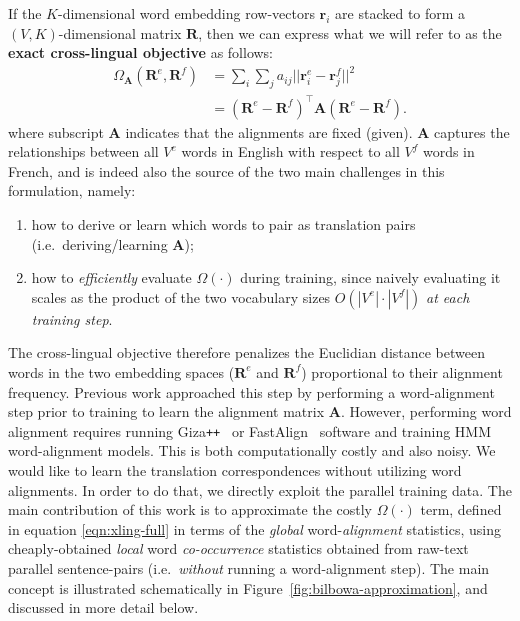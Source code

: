 \documentclass[10pt]{article}
\newcommand\plpl{\texttt{++}}
\newcommand\bld[1]{\textbf{#1}}
\newcommand\mat[1]{\mathbf{#1}}
\begin{document}
If the $K$-dimensional word embedding row-vectors $\mat{r}_i$
are stacked to form a $(V,K)$-dimensional matrix $\mat{R}$, then we can express
what we will refer to as the \bld{exact cross-lingual objective} as follows: 
\begin{align} \label{eqn:xling-full}
  \Omega_\mat{A}(\mat{R}^e, \mat{R}^f) 
    &= \sum_i \sum_j a_{ij} ||\mat{r}^e_i - \mat{r}^f_j ||^2 \\
    &= (\mat{R}^e - \mat{R}^f)^\top \mat{A} (\mat{R}^e - \mat{R}^f).
\end{align}
where subscript $\mat{A}$ indicates that the alignments are fixed (given). $\mat{A}$ captures the 
relationships between all $V^e$ words in English
with respect to all $V^f$ words in French, and is indeed also
the source of the two main challenges in this formulation, namely: 
\begin{enumerate}
  \item how to derive or learn which words to pair as translation pairs (i.e.\ 
    deriving/learning $\mat{A}$); 
  \item how to \emph{efficiently} evaluate $\Omega(\cdot)$ during training, since 
    naively evaluating it scales as the product of the two vocabulary sizes 
    $O(|V^e| \cdot |V^f|)$ \emph{at each training step}.
\end{enumerate}

The cross-lingual objective therefore penalizes the Euclidian distance between
words in the two embedding spaces ($\mathbf{R}^e$ and $\mathbf{R}^f$)
proportional to their alignment frequency. Previous work approached this step
by performing a word-alignment step prior to training to learn the alignment
matrix $\mat{A}$.  However, performing word alignment requires running
Giza\plpl~\cite{och03giza} or FastAlign~\cite{dyer2013simple} software and
training HMM word-alignment models. This is both computationally costly and
also noisy. We would like to learn the translation correspondences without
utilizing word alignments.  In order to do that, we directly exploit the
parallel training data.  The main contribution of this work is to approximate
the costly $\Omega(\cdot)$ term, defined in equation \ref{eqn:xling-full} in terms of
the \emph{global} word-\emph{alignment} statistics, using cheaply-obtained 
\emph{local} word \emph{co-occurrence} statistics obtained from raw-text parallel sentence-pairs
(i.e.\ \emph{without} running a word-alignment step).  The main concept is illustrated
schematically in Figure~\ref{fig:bilbowa-approximation}, and discussed in more
detail below.
\end{document}
